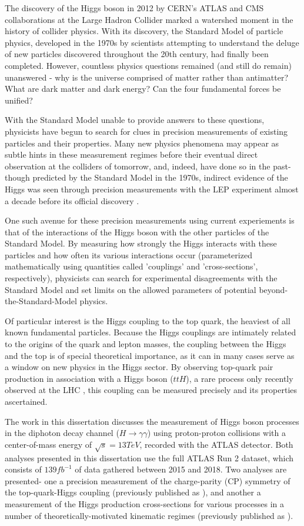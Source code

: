 The discovery of the Higgs boson in 2012 by CERN's ATLAS \cite{HiggsATLAS} and CMS \cite{HiggsCMS} collaborations at the Large Hadron Collider marked a watershed moment in the history of collider physics. With its discovery, the Standard Model of particle physics, developed in the 1970s by scientists attempting to understand the deluge of new particles discovered throughout the 20th century, had finally been completed. However, countless physics questions remained (and still do remain) unanswered - why is the universe comprised of matter rather than antimatter? What are dark matter and dark energy? Can the four fundamental forces be unified?

With the Standard Model unable to provide answers to these questions, physicists have begun to search for clues in precision measurements of existing particles and their properties. Many new physics phenomena may appear as subtle hints in these measurement regimes before their eventual direct observation at the colliders of tomorrow, and, indeed, have done so in the past- though predicted by the Standard Model in the 1970s, indirect evidence of the Higgs was seen through precision measurements with the LEP experiment almost a decade before its official discovery \cite{LEPExperiments}.

One such avenue for these precision measurements using current experiements is that of the interactions of the Higgs boson with the other particles of the Standard Model. By measuring how strongly the Higgs interacts with these particles and how often its various interactions occur (parameterized mathematically using quantities called 'couplings' and 'cross-sections', respectively), physicists can search for experimental disagreements with the Standard Model and set limits on the allowed parameters of potential beyond-the-Standard-Model physics.

Of particular interest is the Higgs coupling to the top quark, the heaviest of all known fundamental particles. Because the Higgs couplings are intimately related to the origins of the quark and lepton masses, the coupling between the Higgs and the top is of special theoretical importance, as it can in many cases serve as a window on new physics in the Higgs sector. By observing top-quark pair production in association with a Higgs boson ($ttH$), a rare process only recently observed at the LHC \cite{ttH}, this coupling can be measured precisely and its properties ascertained.

The work in this dissertation discusses the measurement of Higgs boson processes in the diphoton decay channel ($H \rightarrow \gamma \gamma$) using proton-proton collisions with a center-of-mass energy of $\sqrt{s} = 13 TeV$, recorded with the ATLAS detector.  Both analyses presented in this dissertation use the full ATLAS Run 2 dataset, which consists of $139 fb^{-1}$ of data gathered between 2015 and 2018. Two analyses are presented- one a precision measurement of the charge-parity (CP) symmetry of the top-quark-Higgs coupling (previously published as \cite{CPanalysis}), and another a measurement of the Higgs production cross-sections for various processes in a number of theoretically-motivated kinematic regimes (previously published as \cite{Couplingsanalysis}).
 
